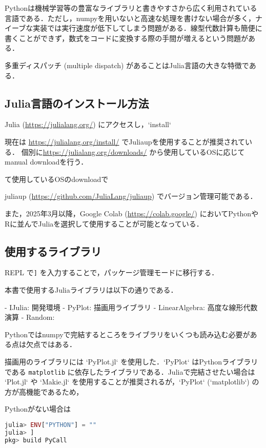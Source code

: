 \documentclass[titlepage]{ltjsbook}
\newcommand{\jl}{\lstinline[language=julia]}
\begin{document}
Pythonは機械学習等の豊富なライブラリと書きやすさから広く利用されている言語である．ただし，numpyを用いないと高速な処理を書けない場合が多く，ナイーブな実装では実行速度が低下してしまう問題がある．線型代数計算も簡便に書くことができず，数式をコードに変換する際の手間が増えるという問題がある．

多重ディスパッチ (multiple dispatch) があることはJulia言語の大きな特徴である．

\subsection{Julia言語のインストール方法}
Julia (\url{https://julialang.org/}) にアクセスし，`install` 

現在は \url{https://julialang.org/install/} でJuliaupを使用することが推奨されている．
個別に\url{https://julialang.org/downloads/} から使用しているOSに応じてmanual downloadを行う．

て使用しているOSのdownloadで

juliaup (\url{https://github.com/JuliaLang/juliaup}) でバージョン管理可能である．

また，2025年3月以降，Google Colab (\url{https://colab.google/}) においてPythonやRに並んでJuliaを選択して使用することが可能となっている．

\subsection{使用するライブラリ}

REPL
で\jl{]} を入力することで，パッケージ管理モードに移行する．

本書で使用するJuliaライブラリは以下の通りである．

- IJulia: 開発環境
- PyPlot: 描画用ライブラリ
- LinearAlgebra: 高度な線形代数演算
- Random: 

Pythonではnumpyで完結するところをライブラリをいくつも読み込む必要がある点は欠点ではある．

描画用のライブラリには `PyPlot.jl` を使用した．`PyPlot` はPythonライブラリである \jl{matplotlib} に依存したライブラリである．Juliaで完結させたい場合は `Plot.jl` や `Makie.jl` を使用することが推奨されるが，`PyPlot` (`matplotlib`) の方が高機能であるため，

Pythonがない場合は

\begin{lstlisting}[language=julia]
julia> ENV["PYTHON"] = ""
julia> ]
pkg> build PyCall
\end{lstlisting}
\end{document}
